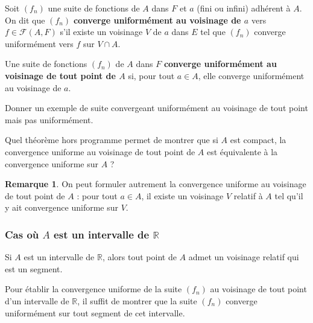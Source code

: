\documentclass[french]{article}
\newcommand{\R}{\mathbb{R}}
\theoremstyle{plain}
\theoremstyle{definition}
\newtheorem*{rmq}{Remarque}
\theoremstyle{remark}
\begin{document}
\begin{dfn}
	Soit $(f_n)$ une suite de fonctions de $A$ dans $F$ et $a$ (fini ou infini) adhérent à $A$.\\
	On dit que $(f_n)$ \textbf{converge uniformément au voisinage de $a$} vers $f\in\mathcal{F}(A,F)$ s'il existe un voisinage $V$ de $a$ dans $E$ tel que $(f_n)$ converge uniformément vers $f$ sur $V\cap A$.
\end{dfn}

\begin{dfn}
	Une suite de fonctions $(f_n)$ de $A$ dans $F$ \textbf{converge uniformément au voisinage de tout point de $A$} si, pour tout $a\in A$, elle converge uniformément au voisinage de $a$.
\end{dfn}

\begin{exo}
	Donner un exemple de suite convergeant uniformément au voisinage de tout point mais pas uniformément. %
\end{exo}

\begin{exo}
	Quel théorème hors programme permet de montrer que si $A$ est compact, la convergence uniforme au voisinage de tout point de $A$ est équivalente à la convergence uniforme sur $A$ ? %
\end{exo}

\begin{rmq}
	On peut formuler autrement la convergence uniforme au voisinage de tout point de $A$ : pour tout $a\in A$, il existe un voisinage $V$ relatif à $A$ tel qu'il y ait convergence uniforme sur $V$.
\end{rmq}

\subsubsection*{Cas où $A$ est un intervalle de $\R$}

\begin{lem}%
	Si $A$ est un intervalle de $\R$, alors tout point de $A$ admet un voisinage relatif qui est un segment.
\end{lem}

\begin{met}
	Pour établir la convergence uniforme de la suite $(f_n)$ au voisinage de tout point d'un intervalle de $\R$, il suffit de montrer que la suite $(f_n)$ converge uniformément sur tout segment de cet intervalle.
\end{met}
\end{document}

